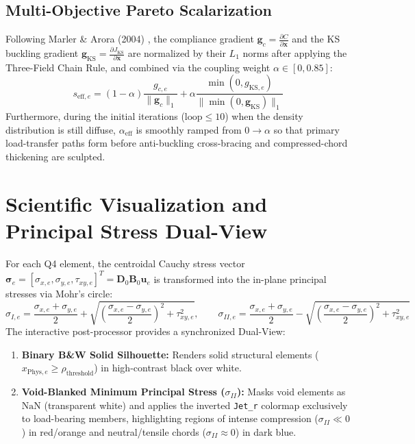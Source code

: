 \documentclass[11pt, a4paper]{article}
\begin{document}
\subsection{Multi-Objective Pareto Scalarization}
Following Marler \& Arora (2004) \cite{marler2004}, the compliance gradient $\mathbf{g}_c = \frac{\partial C}{\partial \mathbf{x}}$ and the KS buckling gradient $\mathbf{g}_{\text{KS}} = \frac{\partial J_{\text{KS}}}{\partial \mathbf{x}}$ are normalized by their $L_1$ norms after applying the Three-Field Chain Rule, and combined via the coupling weight $\alpha \in [0, 0.85]$:
\begin{equation}
    s_{\text{eff}, e} = (1 - \alpha) \frac{g_{c, e}}{\|\mathbf{g}_c\|_1} + \alpha \frac{\min(0, g_{\text{KS}, e})}{\|\min(0, \mathbf{g}_{\text{KS}})\|_1}
\end{equation}
Furthermore, during the initial iterations ($\text{loop} \le 10$) when the density distribution is still diffuse, $\alpha_{\text{eff}}$ is smoothly ramped from $0 \to \alpha$ so that primary load-transfer paths form before anti-buckling cross-bracing and compressed-chord thickening are sculpted.

\section{Scientific Visualization and Principal Stress Dual-View}
For each Q4 element, the centroidal Cauchy stress vector $\boldsymbol{\sigma}_e = [\sigma_{x,e}, \sigma_{y,e}, \tau_{xy,e}]^T = \mathbf{D}_0 \mathbf{B}_0 \mathbf{u}_e$ is transformed into the in-plane principal stresses via Mohr's circle:
\begin{equation}
    \sigma_{I, e} = \frac{\sigma_{x,e} + \sigma_{y,e}}{2} + \sqrt{\left(\frac{\sigma_{x,e} - \sigma_{y,e}}{2}\right)^2 + \tau_{xy,e}^2}, \qquad
    \sigma_{II, e} = \frac{\sigma_{x,e} + \sigma_{y,e}}{2} - \sqrt{\left(\frac{\sigma_{x,e} - \sigma_{y,e}}{2}\right)^2 + \tau_{xy,e}^2}
\end{equation}
The interactive post-processor provides a synchronized Dual-View:
\begin{enumerate}
    \item \textbf{Binary B\&W Solid Silhouette:} Renders solid structural elements ($x_{\text{Phys}, e} \ge \rho_{\text{threshold}}$) in high-contrast black over white.
    \item \textbf{Void-Blanked Minimum Principal Stress ($\sigma_{II}$):} Masks void elements as $\text{NaN}$ (transparent white) and applies the inverted \texttt{Jet\_r} colormap exclusively to load-bearing members, highlighting regions of intense compression ($\sigma_{II} \ll 0$) in red/orange and neutral/tensile chords ($\sigma_{II} \approx 0$) in dark blue.
\end{enumerate}
\end{document}

